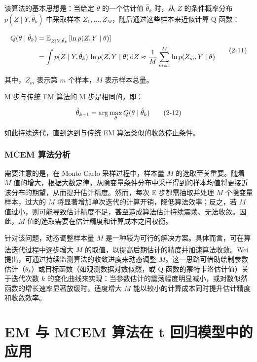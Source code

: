 \documentclass[12pt,a4paper]{ctexart}
\makeatletter
\numberwithin{figure}{section}
\numberwithin{table}{section}
\let\ltx@orig@tag\tag
\renewcommand{\tag}[1]{\refstepcounter{equation}\ltx@orig@tag{#1}}%
\makeatother
\begin{document}
该算法的基本思想是：当给定 $\theta$ 的一个估计值 $\hat{\theta}_k$ 时，从 $Z$ 的条件概率分布 $p(Z\mid Y,\hat{\theta}_k)$ 中采取样本 $Z_1,\dots,Z_M$，随后通过这些样本来近似计算 Q 函数：

\begin{equation}
\begin{aligned}
Q(\theta\mid\hat{\theta}_k)&=\mathbb{E}_{Z\mid Y,\hat{\theta}_k}\left[\ln p(Z,Y\mid\theta)\right] \\
&=\int p(Z\mid Y,\hat{\theta}_k)\,\ln p(Z,Y\mid\theta)\,\mathrm{d}Z\approx\frac{1}{M}\sum_{m=1}^{M}\ln p(Z_m,Y\mid\theta)
\end{aligned}
\tag{2-11}
\end{equation}

其中，$Z_m$ 表示第 $m$ 个样本，$M$ 表示样本总量。

M 步与传统 EM 算法的 M 步是相同的，即：

\begin{equation}
\hat{\theta}_{k+1}=\arg\max_{\theta} Q(\theta\mid\hat{\theta}_k)
\tag{2-12}
\end{equation}

如此持续迭代，直到达到与传统 EM 算法类似的收敛停止条件。

\subsubsection{MCEM 算法分析}

需要注意的是，在 Monte Carlo 采样过程中，样本量 $M$ 的选取至关重要。随着 $M$ 值的增大，根据大数定律，从隐变量条件分布中采样得到的样本均值将更接近该分布的期望，从而提升估计精度。然而，每次 E 步都需抽取并处理 $M$ 个隐变量样本，过大的 $M$ 将显著增加单次迭代的计算开销，降低算法效率；反之，若 $M$ 值过小，则可能导致估计精度不足，甚至造成算法估计持续震荡、无法收敛。因此，$M$ 值的选取需要在估计精度和计算成本之间权衡。

针对该问题，动态调整样本量 $M$ 是一种较为可行的解决方案。具体而言，可在算法迭代过程中逐步增大 $M$ 的取值，以提高后期估计的精度并加速算法收敛。Wei\textsuperscript{\cite{ref37}} 提出，可通过持续监测算法的收敛进度来动态调整 $M$。这一思路可借助绘制参数估计（$\hat{\theta}_k$）或目标函数（如观测数据对数似然，或 Q 函数的蒙特卡洛估计值）关于迭代次数 $k$ 的变化曲线来实现：当参数估计的震荡幅度明显减小，或对数似然函数的增长速率显著放缓时，适度增大 $M$ 能以较小的计算成本同时提升估计精度和收敛效率。

\section{EM 与 MCEM 算法在 t 回归模型中的应用}
\end{document}
